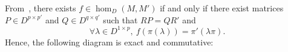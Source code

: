 \documentclass{ifacconf}
\begin{document}
From~\cite{Ro:09}, there exists $f\in\hom_D(M,M')$ if and only if there
exist matrices $P\in D^{p\times p'}$ and $Q\in D^{q\times q'}$ such that
$RP=QR'$ and
\begin{equation}\label{eq:def_of_f}
  \forall\lambda\in D^{1\times p},\ f(\pi(\lambda))=\pi'(\lambda\pi).
\end{equation}
Hence, the following diagram is exact and commutative:


\begin{center}
  \begin{small}
  \end{small}
\end{center}
\end{document}
